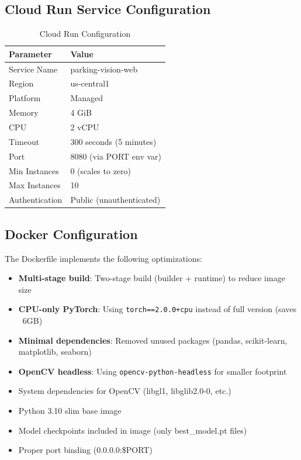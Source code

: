 \documentclass[12pt,a4paper]{article}
\begin{document}
\subsection{Cloud Run Service Configuration}
\begin{table}[H]
\centering
\begin{tabular}{ll}
\toprule
\textbf{Parameter} & \textbf{Value} \\
\midrule
Service Name & parking-vision-web \\
Region & us-central1 \\
Platform & Managed \\
Memory & 4 GiB \\
CPU & 2 vCPU \\
Timeout & 300 seconds (5 minutes) \\
Port & 8080 (via PORT env var) \\
Min Instances & 0 (scales to zero) \\
Max Instances & 10 \\
Authentication & Public (unauthenticated) \\
\bottomrule
\end{tabular}
\caption{Cloud Run Configuration}
\end{table}

\subsection{Docker Configuration}
The Dockerfile implements the following optimizations:
\begin{itemize}
    \item \textbf{Multi-stage build}: Two-stage build (builder + runtime) to reduce image size
    \item \textbf{CPU-only PyTorch}: Using \texttt{torch==2.0.0+cpu} instead of full version (saves ~6GB)
    \item \textbf{Minimal dependencies}: Removed unused packages (pandas, scikit-learn, matplotlib, seaborn)
    \item \textbf{OpenCV headless}: Using \texttt{opencv-python-headless} for smaller footprint
    \item System dependencies for OpenCV (libgl1, libglib2.0-0, etc.)
    \item Python 3.10 slim base image
    \item Model checkpoints included in image (only best\_model.pt files)
    \item Proper port binding (0.0.0.0:\$PORT)
\end{itemize}
\end{document}
